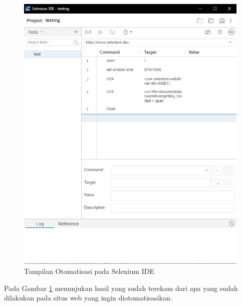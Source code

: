 \begin{enumerate}
\begin{figure}[H]
			\includegraphics[scale=0.4]{Gambar/testing.jpg}
			\caption{Tampilan Otomatisasi pada Selenium IDE} 
			\label{fig:testing}
		\end{figure}
		Pada Gambar \ref{fig:testing} menunjukan hasil yang sudah terekam dari apa yang sudah dilakukan pada situs web yang ingin diotomatisasikan.
	\end{enumerate}